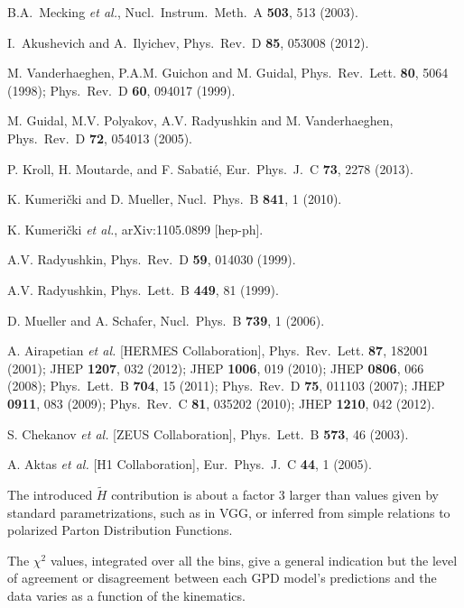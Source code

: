 \documentclass[nofootinbib,twocolumn,showpacs,prl,superscriptaddress,secnumarabic,amssymb,nobibnotes,aps,floatfix]{revtex4-1}
\begin{document}
\begin{thebibliography}{99}
B.A.~Mecking {\it et al.},
Nucl.\ Instrum.\ Meth.\ A {\bf 503}, 513 (2003).

I.~Akushevich and A.~Ilyichev,
Phys.\ Rev.\ D {\bf 85}, 053008 (2012).

M. Vanderhaeghen, P.A.M. Guichon and M. Guidal,
Phys.\ Rev.\ Lett. {\bf 80}, 5064 (1998);
Phys.\ Rev.\ D {\bf 60}, 094017 (1999).

M. Guidal, M.V. Polyakov, A.V. Radyushkin and M. Vanderhaeghen,
Phys.\ Rev.\ D {\bf 72}, 054013 (2005).

P. Kroll, H. Moutarde, and F. Sabati\'{e},
Eur.\ Phys.\ J.\ C {\bf 73}, 2278 (2013).

K. Kumeri\v{c}ki and D. Mueller,
Nucl.\ Phys.\ B {\bf 841}, 1 (2010).

K. Kumeri\v{c}ki {\it et al.},
arXiv:1105.0899 [hep-ph].

A.V. Radyushkin,
Phys.\ Rev.\  D {\bf 59}, 014030 (1999).

A.V. Radyushkin,
Phys.\ Lett.\ B {\bf 449}, 81 (1999).

D. Mueller and A. Schafer,
Nucl.\ Phys.\ B {\bf 739}, 1 (2006).

A. Airapetian {\it et al.} [HERMES Collaboration],
Phys.\ Rev.\ Lett. {\bf 87}, 182001 (2001);
JHEP {\bf 1207}, 032 (2012);
JHEP {\bf 1006}, 019 (2010);
JHEP {\bf 0806}, 066 (2008);
Phys.\ Lett.\ B {\bf 704}, 15 (2011);
Phys.\ Rev.\  D {\bf 75}, 011103 (2007);
JHEP {\bf 0911}, 083 (2009);
Phys.\ Rev.\ C {\bf 81}, 035202 (2010);
JHEP {\bf 1210}, 042 (2012).

S. Chekanov {\it et al.} [ZEUS Collaboration],
Phys.\ Lett.\  B {\bf 573}, 46 (2003).

A. Aktas {\it et al.} [H1 Collaboration],
Eur.\ Phys.\ J.\ C {\bf 44}, 1 (2005).

The introduced $\tilde H$ contribution is about a factor 3 larger than values given by
standard parametrizations, such as in VGG, or inferred from simple relations to
polarized Parton Distribution Functions.

The $\chi^2$ values, integrated over all the bins, give a general indication but the level
of agreement or disagreement between each GPD model's predictions and the data varies as a
function of the kinematics.


\end{thebibliography}
\end{document}
